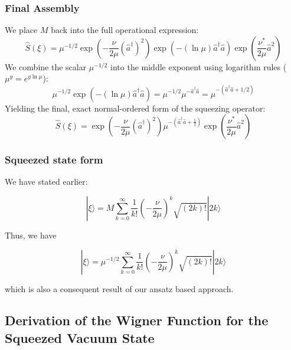 \subsubsection{Final Assembly}
We place $M$ back into the full operational expression:
\begin{equation*}
\hat{S}(\xi) = \mu^{-1/2} \exp\left(-\frac{\nu}{2\mu}(\hat{a}^\dagger)^2\right) \exp\left(-(\ln\mu)\hat{a}^\dagger\hat{a}\right) \exp\left(\frac{\nu^*}{2\mu}\hat{a}^2\right)
\end{equation*}
We combine the scalar $\mu^{-1/2}$ into the middle exponent using logarithm rules ($\mu^y = e^{y\ln\mu}$):
\begin{equation*}
\mu^{-1/2} \exp\left(-(\ln\mu)\hat{a}^\dagger\hat{a}\right) = \mu^{-1/2} \mu^{-\hat{a}^\dagger\hat{a}} = \mu^{-(\hat{a}^\dagger\hat{a} + 1/2)}
\end{equation*}
Yielding the final, exact normal-ordered form of the squeezing operator:
\begin{equation}
\hat{S}(\xi) = \exp\left(-\frac{\nu}{2\mu}(\hat{a}^\dagger)^2\right)\mu^{-(\hat{a}^\dagger\hat{a}+\frac{1}{2})}\exp\left(\frac{\nu^*}{2\mu}\hat{a}^2\right)
\end{equation}

\subsubsection{Squeezed state form}

We have stated earlier:

\begin{equation*}
|\xi\rangle = M \sum_{k=0}^{\infty} \frac{1}{k!} \left(-\frac{\nu}{2\mu}\right)^k \sqrt{(2k)!} |2k\rangle
\end{equation*}

Thus, we have

\begin{equation}
|\xi\rangle = \mu^{-1/2} \sum_{k=0}^{\infty} \frac{1}{k!} \left(-\frac{\nu}{2\mu}\right)^k \sqrt{(2k)!} |2k\rangle
\end{equation}

which is also a consequent result of our ansatz based approach.

\newpage


\subsection{Derivation of the Wigner Function for the Squeezed Vacuum State}

